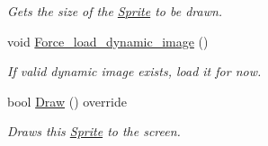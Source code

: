 \begin{DoxyCompactItemize}
\begin{DoxyCompactList}\small\item\em Gets the size of the \hyperlink{classjetfuel_1_1draw_1_1Sprite}{Sprite} to be drawn. \end{DoxyCompactList}\item 
void \hyperlink{classjetfuel_1_1draw_1_1Sprite_a9db9565b3e5db44676ae4a5f6c187753}{Force\+\_\+load\+\_\+dynamic\+\_\+image} ()
\begin{DoxyCompactList}\small\item\em If valid dynamic image exists, load it for now. \end{DoxyCompactList}\item 
bool \hyperlink{classjetfuel_1_1draw_1_1Sprite_ae4e52cd12a067e67ed67d5a2a5835143}{Draw} () override
\begin{DoxyCompactList}\small\item\em Draws this \hyperlink{classjetfuel_1_1draw_1_1Sprite}{Sprite} to the screen. \end{DoxyCompactList}\end{DoxyCompactItemize}
